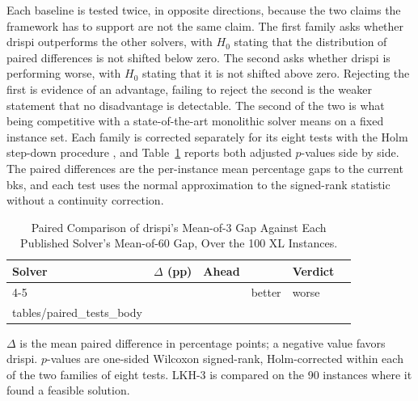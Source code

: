 Each baseline is tested twice, in opposite directions, because the two claims
the framework has to support are not the same claim. The first family asks
whether \gls{drispi} outperforms the other solvers, with $H_0$ stating that the distribution of paired
differences is not shifted below zero. The second asks whether \gls{drispi} is performing
worse, with $H_0$ stating that it is not shifted above zero. Rejecting the
first is evidence of an advantage, failing to reject the second is the weaker
statement that no disadvantage is detectable. The second of the two is what being competitive with a
state-of-the-art monolithic solver means on a fixed instance set. Each
family is corrected separately for its eight tests with the Holm step-down
procedure \citep{holmSimpleSequentiallyRejective1979,demsVarStatisticalComparisonsClassifiers}, and Table~\ref{tab:paired-tests} reports both
adjusted $p$-values side by side. The paired differences are the per-instance mean
percentage gaps to the current \gls{bks}, and each test uses the normal
approximation to the signed-rank statistic without a continuity correction.

\begin{table}[htbp]
  \centering
  \caption{Paired Comparison of \gls{drispi}'s Mean-of-3 Gap Against Each Published
    Solver's Mean-of-60 Gap, Over the 100 XL Instances.}
  \label{tab:paired-tests}
  \small
  \renewcommand{\arraystretch}{0.92}
  \makeatletter
  \def\pairedtestsbody{\@@input tables/paired_tests_body }
  \makeatother
  \begin{tabularx}{\linewidth}{@{}lrr
      >{\centering\arraybackslash}X
      >{\centering\arraybackslash}X
      l@{}}
    \toprule
    Solver & $\Delta$ (pp) & Ahead & \multicolumn{2}{c}{Holm-corrected $p$} & Verdict \\
    \cmidrule(lr){4-5}
    & & & better & worse & \\
    \midrule
    \pairedtestsbody
  \end{tabularx}
  \smallskip
  \begin{minipage}{\linewidth}
    \footnotesize
    $\Delta$ is the mean paired difference in percentage points; a negative value favors \gls{drispi}. $p$-values are one-sided Wilcoxon signed-rank, Holm-corrected within each of the two families of eight tests. LKH-3 is compared on the 90 instances where it found a feasible solution.
  \end{minipage}
\end{table}
\vspace{-\intextsep}

